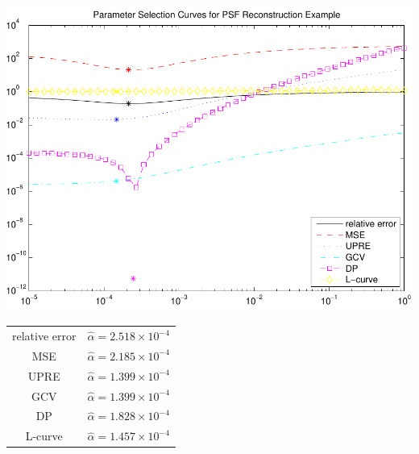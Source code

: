 \documentclass{homework}
\begin{document}
\begin{solution}
\begin{minipage}{.55\textwidth}
\includegraphics[width=\textwidth]{all_curves_psf.pdf}
\end{minipage}
\begin{minipage}{.35\textwidth}
\begin{tabular}{ c c }
\hline
relative error & $\hat \alpha = 2.518\times 10^{-4}$\\
MSE & $\hat \alpha = 2.185\times 10^{-4}$\\
UPRE & $\hat \alpha = 1.399\times 10^{-4}$\\
GCV & $\hat \alpha = 1.399\times 10^{-4}$\\
DP & $\hat \alpha = 1.828\times 10^{-4}$\\
L-curve & $\hat \alpha = 1.457\times 10^{-4}$\\
\hline
\end{tabular}
\end{minipage}
\end{solution}
\end{document}

